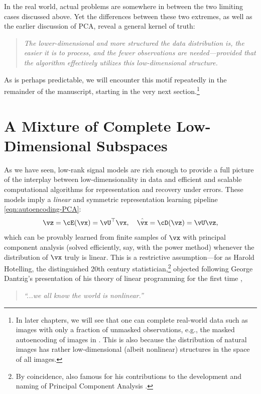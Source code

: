 \documentclass[../../book-main.tex]{subfiles}
\begin{document}
In the real world, actual problems are somewhere in between the two
limiting cases discussed above. Yet the differences between these two
extremes, as well as the earlier discussion of PCA, reveal a general
kernel of truth:
\begin{quote}
    \centering
    \textit{The lower-dimensional and more structured the data
        distribution is, the easier it is to process, and the fewer
        observations are needed---provided that the algorithm effectively
    utilizes this low-dimensional structure.}
\end{quote}
As is perhaps predictable, we will encounter this motif repeatedly in
the remainder of the manuscript, starting in the very next
section.\footnote{In later chapters, we will see that one can
    complete real-world data such as images with only a fraction of
    unmasked observations, e.g., the masked autoencoding of images in
    . This is also because the distribution of
    natural images has rather low-dimensional (albeit nonlinear)
structures in the space of all images.}

\section{A Mixture of Complete Low-Dimensional Subspaces}%
\label{sec:ica}
As we have seen, low-rank signal models are rich enough to provide a
full picture of the interplay between low-dimensionality in data and
efficient and scalable computational algorithms for representation
and recovery under errors.
These models imply a \textit{linear} and symmetric representation
learning pipeline \eqref{eqn:autoencoding-PCA}:
\begin{equation*}
    \vz = \cE(\vx) = \vU^\top \vx, \quad \hat{\vx} = \cD(\vz) = \vU \vz,
\end{equation*}
which can be provably learned from finite samples of $\vx$ with
principal component analysis (solved efficiently, say, with the power
method) whenever the distribution of $\vx$ truly is linear.
This is a restrictive assumption---for as Harold Hotelling, the
distinguished 20th century statistician,\footnote{By coincidence,
    also famous for his contributions to the development and naming of
Principal Component Analysis \cite{Hotelling1933}.} objected
following George Dantzig's presentation of his theory of linear
programming for the first time \cite{Dantzig2002-eh},
\begin{quote}
    \centering
    \textit{``...we all know the world is nonlinear.''}
\end{quote}
\end{document}
